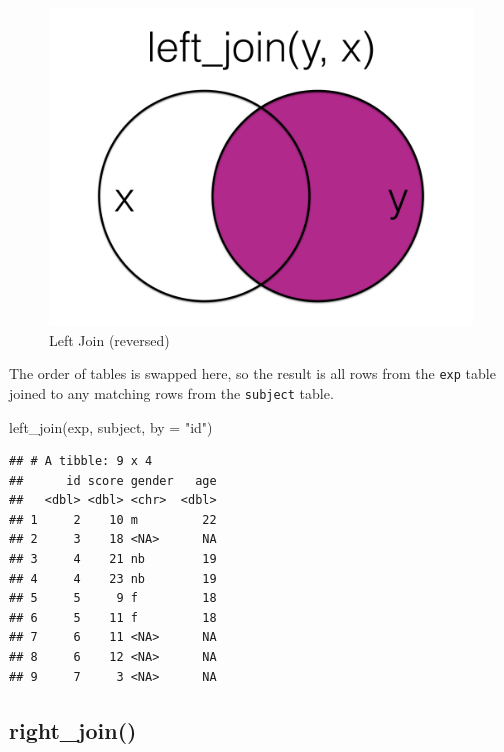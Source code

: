 \documentclass[
  oneside]{book}
\newenvironment{Shaded}{\begin{snugshade}}{\end{snugshade}}
\newcommand{\AttributeTok}[1]{\textcolor[rgb]{0.77,0.63,0.00}{#1}}
\newcommand{\FunctionTok}[1]{\textcolor[rgb]{0.00,0.00,0.00}{#1}}
\newcommand{\NormalTok}[1]{#1}
\newcommand{\StringTok}[1]{\textcolor[rgb]{0.31,0.60,0.02}{#1}}
\begin{document}
\begin{figure}

{\centering \includegraphics[width=1\linewidth]{images/joins/left_join_rev} 

}

\caption{Left Join (reversed)}\label{fig:img-left-join-rev}
\end{figure}

The order of tables is swapped here, so the result is all rows from the \texttt{exp} table joined to any matching rows from the \texttt{subject} table.

\begin{Shaded}
\begin{Highlighting}[]
\FunctionTok{left\_join}\NormalTok{(exp, subject, }\AttributeTok{by =} \StringTok{"id"}\NormalTok{)}
\end{Highlighting}
\end{Shaded}

\begin{verbatim}
## # A tibble: 9 x 4
##      id score gender   age
##   <dbl> <dbl> <chr>  <dbl>
## 1     2    10 m         22
## 2     3    18 <NA>      NA
## 3     4    21 nb        19
## 4     4    23 nb        19
## 5     5     9 f         18
## 6     5    11 f         18
## 7     6    11 <NA>      NA
## 8     6    12 <NA>      NA
## 9     7     3 <NA>      NA
\end{verbatim}

\hypertarget{right_join}{%
\subsection{right\_join()}\label{right_join}}
\end{document}
